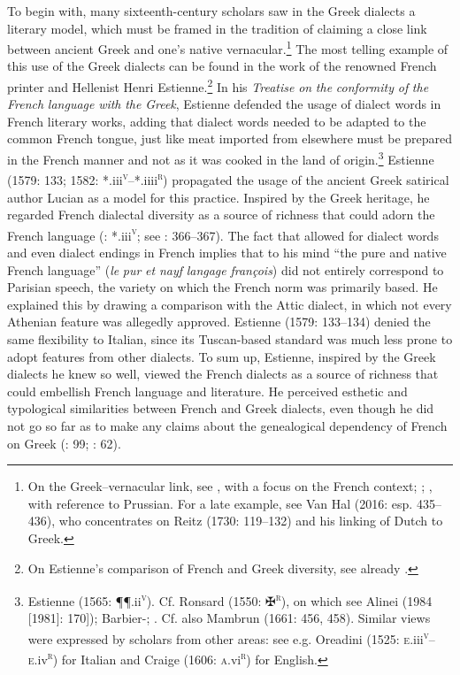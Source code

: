 To begin with, many sixteenth-century scholars saw in the Greek dialects a literary model, which must be framed in the tradition of claiming a close link between ancient Greek and one’s native vernacular.\footnote{On the Greek–vernacular link, see \citet{Demaizière1982}, with a focus on the French context; \citet{Trapp1990}; \citet{Dini2004}, with reference to Prussian. For a late example, see Van Hal (2016: esp. 435–436), who concentrates on Reitz (1730: 119–132) and his linking of Dutch to Greek.} The most telling example of this use of the Greek dialects can be found in the work of the renowned French printer and Hellenist Henri Estienne.\footnote{On Estienne’s comparison of French and Greek diversity, see already \citet[70]{Demaizière1988}.} In his \textit{Treatise} \textit{on} \textit{the} \textit{conformity} \textit{of} \textit{the} \textit{French} \textit{language} \textit{with} \textit{the} \textit{Greek}, Estienne defended the usage of dialect words in French literary works, adding that dialect words needed to be adapted to the common French tongue, just like meat imported from elsewhere must be prepared in the French manner and not as it was cooked in the land of origin.\footnote{Estienne (1565: ¶¶.ii\textsc{\textsuperscript{v}}). Cf. Ronsard (1550: ✠\textsc{\textsuperscript{r}}), on which see Alinei (1984 [1981]: 170]); Barbier-\citet[24]{Mueller1990}; \citet[14]{Trapp1990}. Cf. also Mambrun (1661: 456, 458). Similar views were expressed by scholars from other areas: see e.g. Oreadini (1525: \textsc{e.}iii\textsc{\textsuperscript{v}}–\textsc{e.}iv\textsc{\textsuperscript{r}}) for Italian and Craige (1606: \textsc{a}.vi\textsc{\textsuperscript{r}}) for English.} Estienne (1579: 133; 1582: *.iii\textsc{\textsuperscript{v}}–*.iiii\textsc{\textsuperscript{r}}) propagated the usage of the ancient Greek satirical author Lucian as a model for this practice. Inspired by the Greek heritage, he regarded French dialectal diversity as a source of richness that could adorn the French language (\citealt{Estienne1582}: *.iii\textsc{\textsuperscript{v}}; see \citealt{AurouxClerico1992}: 366–367). The fact that \citet[143]{Estienne1579} allowed for dialect words and even dialect endings in French implies that to his mind “the pure and native French language” (\textit{le} \textit{pur} \textit{et} \textit{nayf} \textit{langage} \textit{françois}) did not entirely correspond to Parisian speech, the variety on which the French norm was primarily based. He explained this by drawing a comparison with the Attic dialect, in which not every Athenian feature was allegedly approved. Estienne (1579: 133–134) denied the same flexibility to Italian, since its Tuscan-based standard was much less prone to adopt features from other dialects. To sum up, Estienne, inspired by the Greek dialects he knew so well, viewed the French dialects as a source of richness that could embellish French language and literature. He perceived esthetic and typological similarities between French and Greek dialects, even though he did not go so far as to make any claims about the genealogical dependency of French on Greek (\citealt{Droixhe1978}: 99; \citealt{Considine2008a}: 62).

